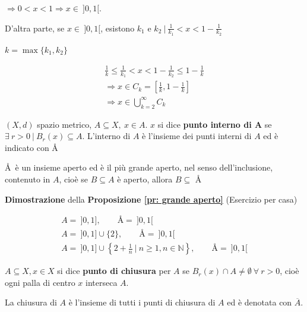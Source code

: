 $\Rightarrow 0 < x < 1 \Rightarrow x \in \ ]0,1[.$

D'altra parte, se $x \in \ ]0,1[$, esistono $k_1$ e $k_2 \ \big| \ \frac{1}{k_1} < x<1 - \frac{1}{k_2}$

$k=\max\{k_1, k_2\}$ 

\begin{gather*}
	\frac{1}{k} \leq \frac{1}{k_1} < x < 1 - \frac{1}{k_2} \leq 1 - \frac{1}{k}
	\\
	\Rightarrow x \in C_k = \left[ \frac{1}{k}, 1 - \frac{1}{k} \right]
	\\
	\Rightarrow x \in \bigcup_{k=2}^{\infty} C_k
\end{gather*}


\begin{definition}
	
	$(X,d)$ spazio metrico, $A \subseteq X, \ x \in A$. $x$ si dice \textbf{punto interno di A} se $\exists \ r > 0 \ \big| \ B_r(x) \subseteq A$. L'interno di $A$ è l'insieme dei punti interni di $A$ ed è indicato con \AA
\end{definition}


\begin{proposition}
	\label{pr: grande aperto}
	\AA \ è un insieme aperto ed è il più grande aperto, nel senso dell'inclusione, contenuto in $A$, cioè se $B \subseteq A$ è aperto, allora $B \subseteq$ \AA
\end{proposition}

\begin{dembar}
	\textbf{Dimostrazione} della \textbf{Proposizione \ref{pr: grande aperto}} (Esercizio per casa)
\end{dembar}


\begin{exbar}
	\begin{gather*}
		A = \ ]0,1], \qquad \text{\AA} = \ ]0,1[
		\\
		A = \ ]0,1] \cup \{ 2 \}, \qquad \text{\AA} = \ ]0,1[
		\\
		A = \ ]0,1] \cup \left\{2 + \frac{1}{n} \ \bigg| \ n \geq 1, n \in \mathbb{N} \right\}, \qquad \text{\AA} = \ ]0,1[
	\end{gather*}
\end{exbar}


\begin{definition}
	$A \subseteq X, x \in X$ si dice \textbf{punto di chiusura} per $A$ se $B_r(x) \cap A \neq \emptyset \ \forall \ r > 0$, cioè ogni palla di centro $x$ interseca $A$. 
	
	La chiusura di $A$ è l'insieme di tutti i punti di chiusura di $A$ ed è denotata con $\overline{A}$.
\end{definition}



